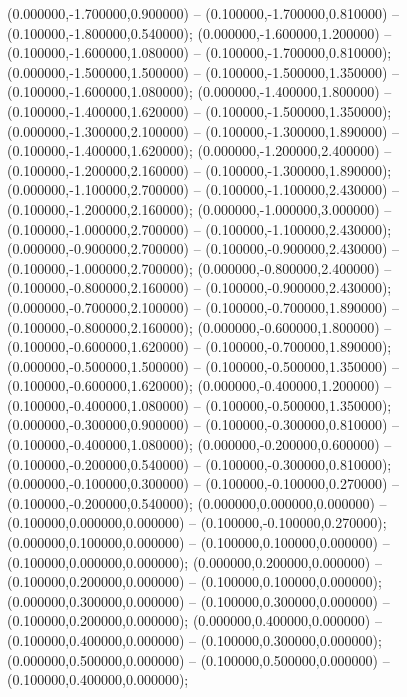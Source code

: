  (0.000000,-1.700000,0.900000) -- (0.100000,-1.700000,0.810000) -- (0.100000,-1.800000,0.540000);
 (0.000000,-1.600000,1.200000) -- (0.100000,-1.600000,1.080000) -- (0.100000,-1.700000,0.810000);
 (0.000000,-1.500000,1.500000) -- (0.100000,-1.500000,1.350000) -- (0.100000,-1.600000,1.080000);
 (0.000000,-1.400000,1.800000) -- (0.100000,-1.400000,1.620000) -- (0.100000,-1.500000,1.350000);
 (0.000000,-1.300000,2.100000) -- (0.100000,-1.300000,1.890000) -- (0.100000,-1.400000,1.620000);
 (0.000000,-1.200000,2.400000) -- (0.100000,-1.200000,2.160000) -- (0.100000,-1.300000,1.890000);
 (0.000000,-1.100000,2.700000) -- (0.100000,-1.100000,2.430000) -- (0.100000,-1.200000,2.160000);
 (0.000000,-1.000000,3.000000) -- (0.100000,-1.000000,2.700000) -- (0.100000,-1.100000,2.430000);
 (0.000000,-0.900000,2.700000) -- (0.100000,-0.900000,2.430000) -- (0.100000,-1.000000,2.700000);
 (0.000000,-0.800000,2.400000) -- (0.100000,-0.800000,2.160000) -- (0.100000,-0.900000,2.430000);
 (0.000000,-0.700000,2.100000) -- (0.100000,-0.700000,1.890000) -- (0.100000,-0.800000,2.160000);
 (0.000000,-0.600000,1.800000) -- (0.100000,-0.600000,1.620000) -- (0.100000,-0.700000,1.890000);
 (0.000000,-0.500000,1.500000) -- (0.100000,-0.500000,1.350000) -- (0.100000,-0.600000,1.620000);
 (0.000000,-0.400000,1.200000) -- (0.100000,-0.400000,1.080000) -- (0.100000,-0.500000,1.350000);
 (0.000000,-0.300000,0.900000) -- (0.100000,-0.300000,0.810000) -- (0.100000,-0.400000,1.080000);
 (0.000000,-0.200000,0.600000) -- (0.100000,-0.200000,0.540000) -- (0.100000,-0.300000,0.810000);
 (0.000000,-0.100000,0.300000) -- (0.100000,-0.100000,0.270000) -- (0.100000,-0.200000,0.540000);
 (0.000000,0.000000,0.000000) -- (0.100000,0.000000,0.000000) -- (0.100000,-0.100000,0.270000);
 (0.000000,0.100000,0.000000) -- (0.100000,0.100000,0.000000) -- (0.100000,0.000000,0.000000);
 (0.000000,0.200000,0.000000) -- (0.100000,0.200000,0.000000) -- (0.100000,0.100000,0.000000);
 (0.000000,0.300000,0.000000) -- (0.100000,0.300000,0.000000) -- (0.100000,0.200000,0.000000);
 (0.000000,0.400000,0.000000) -- (0.100000,0.400000,0.000000) -- (0.100000,0.300000,0.000000);
 (0.000000,0.500000,0.000000) -- (0.100000,0.500000,0.000000) -- (0.100000,0.400000,0.000000);
